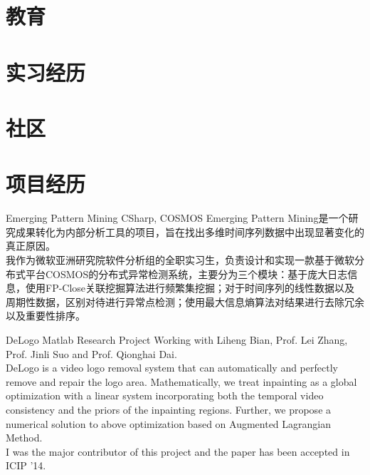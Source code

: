 \documentclass[11pt,a4paper]{moderncv}
\begin{document}
\maketitle

\section{教育}

\section{实习经历}

\section{社区}

\section{项目经历}

{Emerging Pattern Mining}
{CSharp, COSMOS}
{}{}
{
	Emerging Pattern Mining是一个研究成果转化为内部分析工具的项目，旨在找出多维时间序列数据中出现显著变化的真正原因。\\
	我作为微软亚洲研究院软件分析组的全职实习生，负责设计和实现一款基于微软分布式平台COSMOS的分布式异常检测系统，主要分为三个模块：基于庞大日志信息，使用FP-Close关联挖掘算法进行频繁集挖掘；对于时间序列的线性数据以及周期性数据，区别对待进行异常点检测；使用最大信息熵算法对结果进行去除冗余以及重要性排序。
}

\vspace*{0.2\baselineskip}
{DeLogo}
{Matlab}
{Research Project}{}
{Working with Liheng Bian, Prof. Lei Zhang, Prof. Jinli Suo and Prof. Qionghai Dai. \\
	DeLogo is a video logo removal system that can automatically and perfectly remove and repair the logo area. Mathematically, we treat inpainting as a global optimization with a linear system incorporating both the temporal video consistency and the priors of the inpainting regions. Further, we propose a numerical solution to above optimization based on Augmented Lagrangian
	Method. \\
	I was the major contributor of this project and the paper has been accepted in ICIP '14.
}
\end{document}
